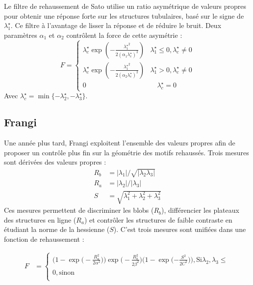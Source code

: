 Le filtre de rehaussement de Sato utilise un ratio asymétrique de valeurs propres pour obtenir une réponse forte sur les structures tubulaires, basé sur le signe de $\lambda^\star_1$.
Ce filtre à l'avantage de lisser la réponse et de réduire le bruit. Deux paramètres $\alpha_1$ et $\alpha_2$ contrôlent la force de cette asymétrie :
\begin{equation}
\nonumber
F =
\left\{
\begin{array}{lr}
\lambda^\star_c \exp(-\frac{{\lambda^\star_1}^2}{2(\alpha_1 \lambda^\star_c)^2})  & \lambda^\star_1 \leqslant 0, \lambda^\star_c \neq 0 \\
\lambda^\star_c \exp(-\frac{{\lambda^\star_1}^2}{2(\alpha_2\lambda^\star_c)^2})  &  \lambda^\star_1 > 0, \lambda^\star_c \neq 0 \\
0 & \quad \lambda^\star_c = 0
\end{array}
\right.
\end{equation}
Avec $\lambda^\star_c = \min\{-\lambda^\star_2,-\lambda^\star_3\}$.

\subsection{Frangi}

Une année plus tard, Frangi \etal \cite{Frangi1998_vesselness} exploitent l'ensemble des valeurs propres afin de proposer un contrôle plus fin sur la géométrie des motifs rehaussés. Trois mesures sont dérivées des valeurs propres :
\begin{align}
 \nonumber
  R_b & = |\lambda_1| / \sqrt{|\lambda_2\lambda_3|}\\
R_a & = |\lambda_2| / |\lambda_3| \nonumber\\
S & = \sqrt{\lambda^2_1 + \lambda^2_2 + \lambda^2_3} \nonumber
\end{align}
Ces mesures permettent de discriminer les blobs ($R_b$), différencier les plateaux des structures en ligne ($R_a$) et contrôler les structures de faible contraste en étudiant la norme de la hessienne ($S$). C'est trois mesures sont unifiées dans une fonction de rehaussement :   

\begin{align}
  F & = \begin{cases} 
                \big(1-\exp\big(-\frac{R_a^2}{2\alpha^2}\big)\big) \exp\big(-\frac{R_b^2}{2\beta^2}\big)\big(1-\exp(-\frac{S^2}{2C^2}\big)\big), \text{Si} \lambda_2, \lambda_3 \leqslant  \\
                0, \text{sinon} \\
              \end{cases}
\end{align}

